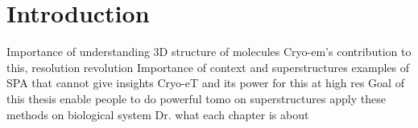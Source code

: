 \chapter{Introduction}\label{introduction}

\begin{outline}
\1 Importance of understanding 3D structure of molecules
    \2 Cryo-em's contribution to this, resolution revolution
\1 Importance of context and superstructures
    \2 examples of SPA that cannot give insights
    \2 Cryo-eT and its power for this at high res
\1 Goal of this thesis
    \2 enable people to do powerful tomo on superstructures
    \2 apply these methods on biological system
    \2 Dr.
\1 what each chapter is about
\end{outline}
